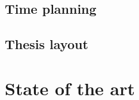 \section{Time planning}
\label{sec:time-planning}


\section{Thesis layout}
\label{sec:layout}


\cleardoublepage
\chapter{State of the art}
\label{chap:sota}



\cleardoublepage